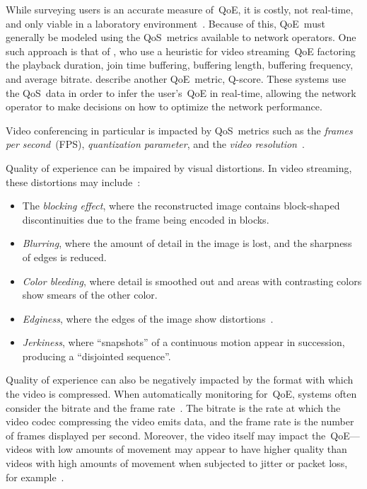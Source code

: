        While surveying users is an accurate measure of~QoE, it is costly, not real-time, and only viable in a laboratory environment~\autocite{ChenYanjiao2015FQtQ,SongHan2011Qpsq}. Because of this, QoE~must generally be modeled using the QoS~metrics available to network operators. One such approach is that of \textcite{DinakiHosseinEbrahimi2021FVQW}, who use a heuristic for video streaming~QoE factoring the playback duration, join time buffering, buffering length, buffering frequency, and average bitrate. \Textcite{SongHan2011Qpsq} describe another QoE~metric, Q-score. These systems use the QoS~data in order to infer the user's~QoE in real-time, allowing the network operator to make decisions on how to optimize the network performance.

        Video conferencing in particular is impacted by QoS~metrics such as the \emph{frames per second}~(FPS), \emph{quantization parameter}, and the \emph{video resolution}~\autocite{MacMillanKyle2021MtPa}.

        Quality of experience can be impaired by visual distortions. In video streaming, these distortions may include~\autocite{YuenMichael1998Asoh}:
        \begin{itemize}
            \item The \emph{blocking effect}, where the reconstructed image contains block-shaped discontinuities due to the frame being encoded in blocks.
            \item \emph{Blurring}, where the amount of detail in the image is lost, and the sharpness of edges is reduced.
            \item \emph{Color bleeding}, where detail is smoothed out and areas with contrasting colors show smears of the other color.
            \item \emph{Edginess}, where the edges of the image show distortions~\autocite{ChenYanjiao2015FQtQ}.
            \item \emph{Jerkiness}, where \enquote{snapshots} of a continuous motion appear in succession, producing a \enquote{disjointed sequence}.
        \end{itemize}

        Quality of experience can also be negatively impacted by the format with which the video is compressed. When automatically monitoring for~QoE, systems often consider the bitrate and the frame rate~\autocite{ChenYanjiao2015FQtQ}. The bitrate is the rate at which the video codec compressing the video emits data, and the frame rate is the number of frames displayed per second. Moreover, the video itself may impact the~QoE---videos with low amounts of movement may appear to have higher quality than videos with high amounts of movement when subjected to jitter or packet loss, for example~\autocite{ChenYanjiao2015FQtQ}.


